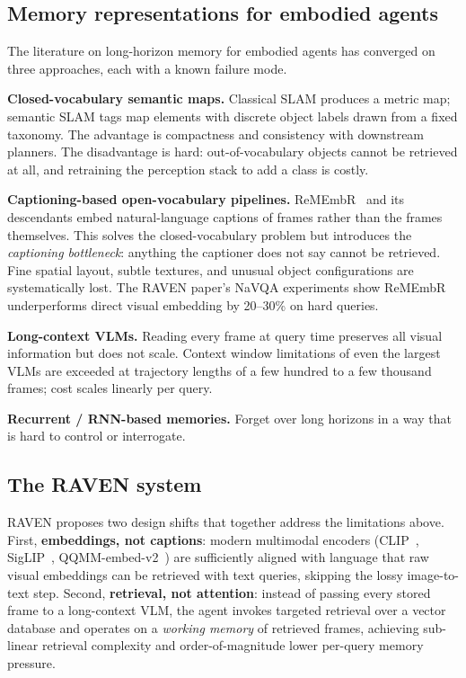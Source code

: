 \documentclass[12pt,letterpaper,oneside]{article}
\begin{document}
\subsection{Memory representations for embodied agents}

The literature on long-horizon memory for embodied agents has
converged on three approaches, each with a known failure mode.

\textbf{Closed-vocabulary semantic maps.}  Classical SLAM produces a
metric map; semantic SLAM tags map elements with discrete object
labels drawn from a fixed taxonomy.  The advantage is compactness and
consistency with downstream planners.  The disadvantage is hard:
out-of-vocabulary objects cannot be retrieved at all, and retraining
the perception stack to add a class is costly.

\textbf{Captioning-based open-vocabulary pipelines.}
ReMEmbR~\cite{ref:remembr} and its descendants embed natural-language
captions of frames rather than the frames themselves.  This solves the
closed-vocabulary problem but introduces the \emph{captioning
bottleneck}: anything the captioner does not say cannot be retrieved.
Fine spatial layout, subtle textures, and unusual object configurations
are systematically lost.  The RAVEN paper's NaVQA experiments show
ReMEmbR underperforms direct visual embedding by 20--30\% on hard
queries.

\textbf{Long-context VLMs.}  Reading every frame at query time
preserves all visual information but does not scale.  Context window
limitations of even the largest VLMs are exceeded at trajectory lengths
of a few hundred to a few thousand frames; cost scales linearly per
query.

\textbf{Recurrent / RNN-based memories.}  Forget over long horizons in
a way that is hard to control or interrogate.

\subsection{The RAVEN system}

RAVEN proposes two design shifts that together address the limitations
above.  First, \textbf{embeddings, not captions}: modern multimodal
encoders (CLIP~\cite{ref:clip}, SigLIP~\cite{ref:siglip},
QQMM-embed-v2~\cite{ref:qqmm}) are sufficiently aligned with language
that raw visual embeddings can be retrieved with text queries,
skipping the lossy image-to-text step.  Second, \textbf{retrieval, not
attention}: instead of passing every stored frame to a long-context
VLM, the agent invokes targeted retrieval over a vector database and
operates on a \emph{working memory} of retrieved frames, achieving
sub-linear retrieval complexity and order-of-magnitude lower per-query
memory pressure.
\end{document}

